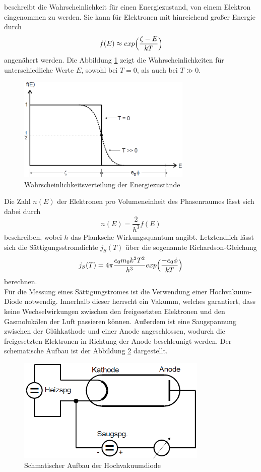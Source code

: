 beschreibt die Wahrscheinlichkeit für einen Energiezustand, von einem Elektron eingenommen zu werden. 
Sie kann für Elektronen mit hinreichend großer Energie durch 
\begin{equation}
    f(E) \approx exp \Bigl(\frac{\zeta-E}{kT}\Bigr)
\end{equation} angenähert werden. Die Abbildung \ref{fig:fermi} zeigt die Wahrscheinlichkeiten für unterschiedliche Werte $E$, sowohl bei 
$T=0$, als auch bei $T \gg 0$.
\begin{figure}
    \centering
    \includegraphics[height=5cm]{data/fermi.png}
    \caption{Wahrscheinlichkeitsverteilung der Energiezustände}
    \label{fig:fermi}
\end{figure}
\FloatBarrier
Die Zahl $n(E)$ der Elektronen pro Volumeneinheit des Phasenraumes lässt sich dabei durch 
\begin{equation}
    n(E) = \frac{2}{h^3} f(E)
\end{equation}  
beschreiben, wobei $h$ das Planksche Wirkungsquantum angibt. Letztendlich lässt sich die Sättigungsstromdichte $j_S(T)$ über die sogenannte
Richardson-Gleichung 
\begin{equation}
    j_S(T) = 4\pi \frac{e_0 m_0 k^2 T^2}{h^3} exp\Bigl(\frac{-e_0 \phi}{kT}\Bigr)
    \label{eqn:richard}
\end{equation}
berechnen. 
\\
Für die Messung eines Sättigungstromes ist die Verwendung einer Hochvakuum-Diode notwendig. Innerhalb dieser herrscht ein Vakumm, welches 
garantiert, dass keine Wechselwirkungen zwischen den freigesetzten Elektronen und den Gasmolukälen der Luft passieren können. Außerdem ist 
eine Saugspannung zwischen der Glühkathode und einer Anode angeschlossen, wodurch die freigesetzten Elektronen in Richtung der Anode beschleunigt
werden. Der schematische Aufbau ist der Abbildung \ref{fig:diode} dargestellt.
\begin{figure}
    \centering
    \includegraphics[height=5cm]{data/aufbau.png}
    \caption{Schmatischer Aufbau der Hochvakuumdiode}
    \label{fig:diode}
\end{figure}
